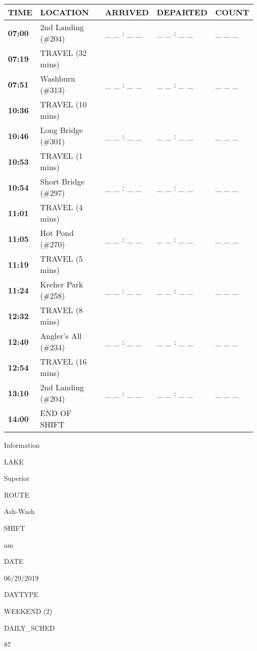 \documentclass[]{article}
\begin{document}
\begin{tabular}{>{\bfseries}lllll}
\toprule
\textbf{TIME} & \textbf{LOCATION} & \textbf{ARRIVED} & \textbf{DEPARTED} & \textbf{COUNT}\\
\midrule
07:00 & 2nd Landing (\#204) & \_ \_ : \_ \_ & \_ \_ : \_ \_ & \_ \_ \_\\
07:19 & TRAVEL (32 mins) &  &  & \\
07:51 & Washburn (\#313) & \_ \_ : \_ \_ & \_ \_ : \_ \_ & \_ \_ \_\\
10:36 & TRAVEL (10 mins) &  &  & \\
10:46 & Long Bridge (\#301) & \_ \_ : \_ \_ & \_ \_ : \_ \_ & \_ \_ \_\\
10:53 & TRAVEL (1 mins) &  &  & \\
10:54 & Short Bridge (\#297) & \_ \_ : \_ \_ & \_ \_ : \_ \_ & \_ \_ \_\\
11:01 & TRAVEL (4 mins) &  &  & \\
11:05 & Hot Pond (\#270) & \_ \_ : \_ \_ & \_ \_ : \_ \_ & \_ \_ \_\\
11:19 & TRAVEL (5 mins) &  &  & \\
11:24 & Kreher Park (\#258) & \_ \_ : \_ \_ & \_ \_ : \_ \_ & \_ \_ \_\\
12:32 & TRAVEL (8 mins) &  &  & \\
12:40 & Angler's All (\#234) & \_ \_ : \_ \_ & \_ \_ : \_ \_ & \_ \_ \_\\
12:54 & TRAVEL (16 mins) &  &  & \\
13:10 & 2nd Landing (\#204) & \_ \_ : \_ \_ & \_ \_ : \_ \_ & \_ \_ \_\\
14:00 & END OF SHIFT &  &  & \\
\bottomrule
\end{tabular}\newpage

Information

LAKE

Superior

ROUTE

Ash-Wash

SHIFT

am

DATE

06/29/2019

DAYTYPE

WEEKEND (2)

DAILY\_SCHED

87

\vspace{24pt}
\end{document}
